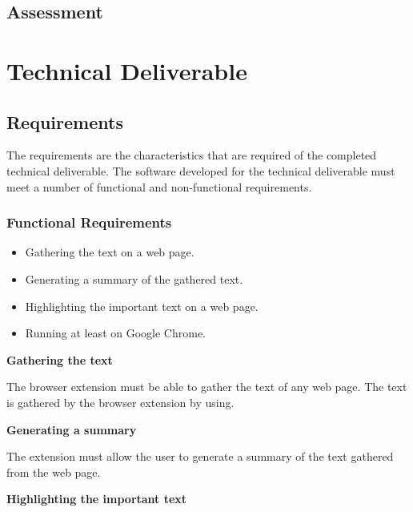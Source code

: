 \documentclass[conference,compsoc]{IEEEtran}
\begin{document}

\subsection{Assessment}


\section{Technical Deliverable}
\label{sec-tech-production}
\subsection{Requirements}

The requirements are the characteristics that are required of the completed technical deliverable.
The software developed for the technical deliverable must meet a number of functional and non-functional requirements.

\subsubsection{Functional Requirements}

\begin{itemize}
  \item Gathering the text on a web page.
  \item Generating a summary of the gathered text.
  \item Highlighting the important text on a web page.
  \item Running at least on Google Chrome.
\end{itemize}

\vspace{0.4cm}
\textbf{Gathering the text}

The browser extension must be able to gather the text of any web page.
The text is gathered by the browser extension by using.


\vspace{0.4cm}
\textbf{Generating a summary}

The extension must allow the user to generate a summary of the text gathered from the web page.

\vspace{0.4cm}
\textbf{Highlighting the important text}
\end{document}
